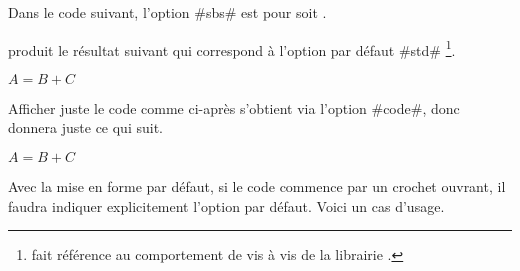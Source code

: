 \documentclass[10pt, a4paper]{article}
\begin{document}
\begin{bdocexa}
    Dans le code suivant, l'option \bdocinlatex#sbs# est pour  soit .

\end{bdocexa}




\begin{bdocexa}[À la suite]
     produit le résultat suivant qui correspond à l'option par défaut \bdocinlatex#std#
    \footnote{
         fait référence au comportement  de  vis à vis de la librairie .
    }.

    \begin{bdoclatex}
        $A = B + C$
    \end{bdoclatex}
\end{bdocexa}




\begin{bdocexa}
    Afficher juste le code comme ci-après s'obtient via l'option \bdocinlatex#code#, donc  donnera juste ce qui suit.

    \begin{bdoclatex}[code]
        $A = B + C$
    \end{bdoclatex}
\end{bdocexa}




\begin{bdocwarn}
    Avec la mise en forme par défaut, si le code commence par un crochet ouvrant, il faudra indiquer explicitement l'option par défaut. Voici un cas d'usage.

\end{bdocwarn}
\end{document}
